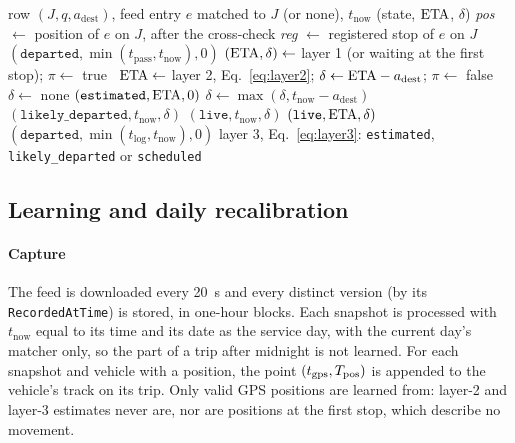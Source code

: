 \begin{algorithm}[p]
\caption{State and arrival of a row.}
\label{alg:row}
\small
\begin{algorithmic}[1]
\Require row $(J,q,a_{\mathrm{dest}})$, feed entry $e$ matched to $J$ (or none), $t_{\mathrm{now}}$
\Ensure (state, $\mathrm{ETA}$, $\delta$)
\State \textit{pos} $\gets$ position of $e$ on $J$, after the cross-check 
\State \textit{reg} $\gets$ registered stop of $e$ on $J$
 \Return {} \EndIf
{} \Return $(\texttt{departed},\min(t_{\mathrm{pass}},t_{\mathrm{now}}),0)$ \EndIf
{} \Return {} \EndIf
{} $(\mathrm{ETA},\delta)\gets$ layer 1 (or waiting at the first stop); $\pi\gets$ true
\Else\ $\mathrm{ETA}\gets$ layer 2, Eq.~\eqref{eq:layer2}; $\delta\gets\mathrm{ETA}-a_{\mathrm{dest}}$; $\pi\gets$ false
\EndIf
{} $\delta\gets$ none \EndIf
{}  \Return {} \EndIf
\State \Return $(\texttt{estimated},\mathrm{ETA},0)$ \EndIf
{} 
 $\delta\gets\max(\delta,t_{\mathrm{now}}-a_{\mathrm{dest}})$ \EndIf
{} \Return $(\texttt{likely\_departed},t_{\mathrm{now}},\delta)$ \EndIf
\State \Return $(\texttt{live},t_{\mathrm{now}},\delta)$
\EndIf
\State \Return $(\texttt{live},\mathrm{ETA},\delta)$
\State \Return $(\texttt{departed},\min(t_{\mathrm{log}},t_{\mathrm{now}}),0)$
\EndIf
\State \Return layer 3, Eq.~\eqref{eq:layer3}: \texttt{estimated}, \texttt{likely\_departed} or \texttt{scheduled}
\EndFunction
\end{algorithmic}
\end{algorithm}

\subsection{Learning and daily recalibration}
\label{sec:learning}

\paragraph{Capture} The feed is downloaded every 20~s and every distinct version (by its \texttt{RecordedAtTime}) is
stored, in one-hour blocks. Each snapshot is processed with $t_{\mathrm{now}}$ equal to its time and its date as the
service day, with the current day's matcher only, so the part of a trip after midnight is not learned. For each
snapshot and vehicle with a position, the point $(t_{\mathrm{gps}},T_{\mathrm{pos}})$ is appended to the vehicle's track on its trip. Only
valid GPS positions are learned from: layer-2 and layer-3 estimates never are, nor are positions at the first stop,
which describe no movement.

